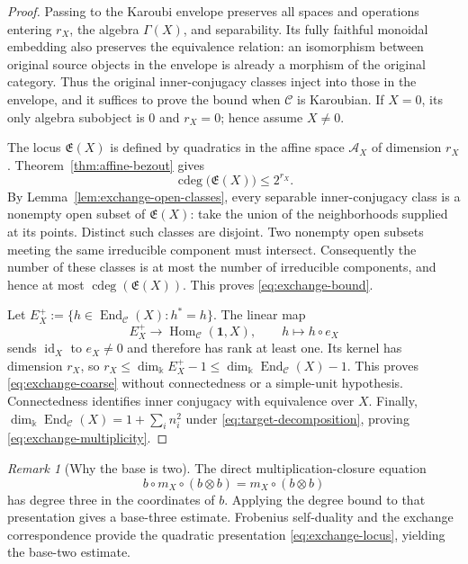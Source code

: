 \documentclass[11pt]{amsart}
\theoremstyle{definition}
\theoremstyle{remark}
\newtheorem{remark}[theorem]{Remark}
\newcommand{\C}{\mathcal C}
\newcommand{\one}{\mathbf 1}
\newcommand{\kk}{\Bbbk}
\newcommand{\Exch}{\mathfrak E}
\DeclareMathOperator{\Hom}{Hom}
\DeclareMathOperator{\End}{End}
\DeclareMathOperator{\cdeg}{cdeg}
\DeclareMathOperator{\id}{id}
\begin{document}
\begin{proof}
Passing to the Karoubi envelope preserves all spaces and operations
entering $r_X$, the algebra $\Gamma(X)$, and separability.  Its fully
faithful monoidal embedding also preserves the equivalence relation:
an isomorphism between original source objects in the envelope is
already a morphism of the original category.  Thus the original
inner-conjugacy classes inject into those in the envelope, and it
suffices to prove the bound when $\C$ is Karoubian.  If $X=0$, its
only algebra subobject is $0$ and $r_X=0$; hence assume $X\ne0$.

The locus $\Exch(X)$ is defined by quadratics in the affine space
$\mathscr A_X$ of dimension $r_X$.  Theorem~\ref{thm:affine-bezout} gives
\[
 \cdeg\bigl(\Exch(X)\bigr)\leq2^{r_X}.
\]
By Lemma~\ref{lem:exchange-open-classes}, every separable inner-conjugacy
class is a nonempty open subset of $\Exch(X)$: take the union of the
neighborhoods supplied at its points.  Distinct such classes are disjoint.
Two nonempty open subsets meeting the same irreducible component must
intersect.  Consequently the number of these classes is at most the
number of irreducible components, and hence at most
$\cdeg(\Exch(X))$.  This proves \eqref{eq:exchange-bound}.

Let $E_X^+:=\{h\in\End_{\C}(X):h^*=h\}$.  The linear map
\[
 E_X^+\longrightarrow\Hom_{\C}(\one,X),\qquad h\longmapsto h\circ e_X
\]
sends $\id_X$ to $e_X\ne0$ and therefore has rank at least one.
Its kernel has dimension $r_X$, so
$r_X\leq\dim_{\kk}E_X^+-1\leq\dim_{\kk}\End_{\C}(X)-1$.
This proves \eqref{eq:exchange-coarse} without connectedness or a
simple-unit hypothesis.  Connectedness identifies inner conjugacy with
equivalence over $X$.  Finally,
$\dim_{\kk}\End_{\C}(X)=1+\sum_i n_i^2$ under
\eqref{eq:target-decomposition}, proving
\eqref{eq:exchange-multiplicity}.
\end{proof}



\begin{remark}[Why the base is two]\label{rem:why-base-two}
The direct multiplication-closure equation
\[
 b\circ m_X\circ(b\otimes b)=m_X\circ(b\otimes b)
\]
has degree three in the coordinates of $b$.  Applying the degree bound
to that presentation gives a base-three estimate.  Frobenius self-duality
and the exchange correspondence provide the quadratic presentation
\eqref{eq:exchange-locus}, yielding the base-two estimate.
\end{remark}
\end{document}
